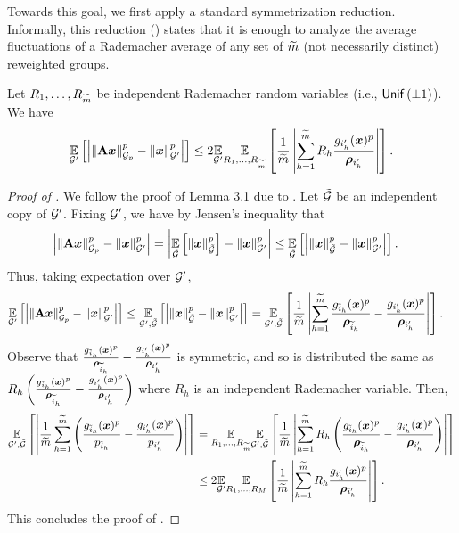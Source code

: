 \documentclass[11pt]{article}
\numberwithin{equation}{section}
\begin{document}
Towards this goal, we first apply a standard symmetrization reduction. Informally, this reduction () states that it is enough to analyze the average fluctuations of a Rademacher average of any set of $\widetilde{m}$ (not necessarily distinct) reweighted groups.
\begin{lemma}
\label{lemma:symmetrization} 
Let $R_1,\dots,R_{\widetilde{m}}$ be independent Rademacher random variables (i.e., $\mathsf{Unif}\left(\pm 1\right)$). We have
\begin{align*}
    \underset{\mathcal{G}'}{\mathbb{E}}\left[\left\lvert \left\lVert \mathbf{A}\bm{x} \right\rVert_{\mathcal{G}_{p}}^p - \left\lVert \bm{x} \right\rVert_{\mathcal{G}'}^p \right\rvert\right] \le 2 \underset{\mathcal{G}'}{\mathbb{E}} \underset{R_1, \ldots, R_{\widetilde{m}}}{\mathbb{E}}\left[\frac{1}{\widetilde{m}}\left\lvert \sum_{h=1}^{\widetilde{m}} R_h \frac{g_{i'_h}(\bm{x})^p}{\bm{\rho}_{i'_h}} \right\rvert\right].
\end{align*}
\end{lemma}
\begin{proof}[Proof of ]
We follow the proof of Lemma 3.1 due to \citet{lee22}. Let \(\tilde{\mathcal{G}}\) be an independent copy of \(\mathcal{G}'\). Fixing \(\mathcal{G}'\), we have by Jensen's inequality that
\begin{align*}
    \left\lvert \left\lVert \mathbf{A}\bm{x} \right\rVert_{\mathcal{G}_{p}}^p - \left\lVert \bm{x} \right\rVert_{\mathcal{G}'}^p \right\rvert &= \left\lvert \underset{\tilde{\mathcal{G}}}{\mathbb{E}}\left[\left\lVert \bm{x} \right\rVert_{\tilde{\mathcal{G}}}^p\right] - \left\lVert \bm{x} \right\rVert_{\mathcal{G}'}^p \right\rvert
    \leq \underset{\tilde{\mathcal{G}}}{\mathbb{E}}\left[\left\lvert \left\lVert \bm{x} \right\rVert_{\tilde{\mathcal{G}}}^p - \left\lVert \bm{x} \right\rVert_{\mathcal{G}'}^p \right\rvert\right].
\end{align*}
Thus, taking expectation over \(\mathcal{G}'\),
\begin{align*}
    \underset{\mathcal{G}'}{\mathbb{E}}\left[\left\lvert \left\lVert \mathbf{A}\bm{x} \right\rVert_{\mathcal{G}_{p}}^p - \left\lVert \bm{x} \right\rVert_{\mathcal{G}'}^p \right\rvert\right] &\leq \underset{\mathcal{G}', \tilde{\mathcal{G}}}{\mathbb{E}}\left[\left\lvert \left\lVert \bm{x} \right\rVert_{\tilde{\mathcal{G}}}^p - \left\lVert \bm{x} \right\rVert_{\mathcal{G}'}^p \right\rvert\right]
    = \underset{\mathcal{G}', \tilde{\mathcal{G}}}{\mathbb{E}}\left[\frac{1}{\widetilde{m}}\left\lvert \sum_{h=1}^{\widetilde{m}} \frac{g_{\tilde{i}_h}(\bm{x})^p}{\bm{\rho}_{\widetilde{i}_h}} -\frac{g_{i'_h}(\bm{x})^p}{\bm{\rho}_{i'_h}} \right\rvert\right].
\end{align*}
Observe that \(\frac{g_{\tilde{i}_h}(\bm{x})^p}{\bm{\rho}_{\widetilde{i}_h}} -\frac{g_{i'_h}(\bm{x})^p}{\bm{\rho}_{i'_h}}\) is symmetric,
and so is distributed the same as \(R_h \left(\frac{g_{\tilde{i}_h}(\bm{x})^p}{\bm{\rho}_{\widetilde{i}_h}} -\frac{g_{i'_h}(\bm{x})^p}{\bm{\rho}_{i'_h}}\right)\)
where \(R_h\) is an independent Rademacher variable. Then,
\begin{align*}
    \underset{\mathcal{G}', \tilde{\mathcal{G}}}{\mathbb{E}}\left[\left\lvert \frac{1}{\widetilde{m}}\sum_{h=1}^{\widetilde{m}} \left(\frac{g_{\tilde{i}_h}(\bm{x})^p}{p_{\tilde{i}_h}} -\frac{g_{i'_h}(\bm{x})^p}{p_{i'_h}}\right) \right\rvert\right] &= \underset{R_1, \ldots, R_{\widetilde{m}}}{\mathbb{E}} \underset{\mathcal{G}', \tilde{\mathcal{G}}}{\mathbb{E}}\left[\frac{1}{\widetilde{m}}\left\lvert \sum_{h=1}^{\widetilde{m}} R_h \left(\frac{g_{\tilde{i}_h}(\bm{x})^p}{\bm{\rho}_{\widetilde{i}_h}} -\frac{g_{i'_h}(\bm{x})^p}{\bm{\rho}_{i'_h}}\right) \right\rvert\right] \\
    &\leq 2 \underset{\mathcal{G}'}{\mathbb{E}} \underset{R_1, \ldots, R_M}{\mathbb{E}}\left[\frac{1}{\widetilde{m}}\left\lvert \sum_{h=1}^{\widetilde{m}} R_h \frac{g_{i'_h}(\bm{x})^p}{\bm{\rho}_{i'_h}} \right\rvert\right].
\end{align*}
This concludes the proof of .
\end{proof}
\end{document}
